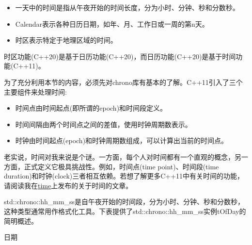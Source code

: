\begin{itemize}
\item 
一天中的时间是指从午夜开始的时间长度，分为小时、分钟、秒和分数秒。

\item 
Calendar表示各种日历日期，如年、月、工作日或一周的第n天。

\item 
时区表示特定于地理区域的时间。
\end{itemize}

时区功能(C++20)是基于日历功能(C++20)，而日历功能(C++20)是基于时间功能(C++11)。


\begin{tcolorbox}[breakable,enhanced jigsaw,colback=blue!5!white,colframe=blue!75!black,title={C++11的时间库}]
	
为了充分利用本节的内容，必须先对chrono库有基本的了解。C++11引入了三个主要组件来处理时间:

\begin{itemize}
\item 
时间点由时间起点(即所谓的epoch)和时间段定义。

\item 
时间间隔由两个时间点之间的差值，使用时钟周期数表示。

\item 
时钟由时间起点(epoch)和时钟周期数组成，可以计算出当前的时间点。
\end{itemize}

老实说，时间对我来说是个谜。一方面，每个人对时间都有一个直观的概念，另一方面，正式定义它极具挑战性。例如，时间点(time point)、时间段(time duration)和时钟(clock)三者相互依赖。若想了解更多C++11中有关时间的功能，请阅读我在\href{https://www.modernescpp.com/index.php/tag/time}{time}上发布的关于时间的文章。
	
\end{tcolorbox}


std::chrono::hh\_mm\_ss是自午夜开始的时间段，分为小时、分钟、秒和分数秒，这种类型通常用作格式化工具。下表提供了std::chrono::hh\_mm\_ss实例tOfDay的简明概述。

\begin{center}
日期
\end{center}

